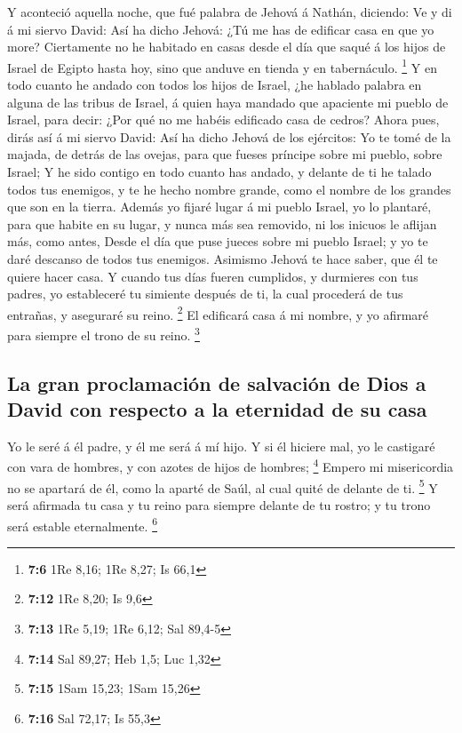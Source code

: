  Y aconteció aquella noche, que fué palabra de Jehová á
Nathán, diciendo:  Ve y di á mi siervo David: Así ha dicho
Jehová: ¿Tú me has de edificar casa en que yo more? 
Ciertamente no he habitado en casas desde el día que saqué á los hijos
de Israel de Egipto hasta hoy, sino que anduve en tienda y en
tabernáculo. \footnote{\textbf{7:6} 1Re 8,16; 1Re 8,27; Is 66,1}
 Y en todo cuanto he andado con todos los hijos de Israel,
¿he hablado palabra en alguna de las tribus de Israel, á quien haya
mandado que apaciente mi pueblo de Israel, para decir: ¿Por qué no me
habéis edificado casa de cedros?  Ahora pues, dirás así á
mi siervo David: Así ha dicho Jehová de los ejércitos: Yo te tomé de la
majada, de detrás de las ovejas, para que fueses príncipe sobre mi
pueblo, sobre Israel;  Y he sido contigo en todo cuanto
has andado, y delante de ti he talado todos tus enemigos, y te he hecho
nombre grande, como el nombre de los grandes que son en la tierra.
 Además yo fijaré lugar á mi pueblo Israel, yo lo
plantaré, para que habite en su lugar, y nunca más sea removido, ni los
inicuos le aflijan más, como antes,  Desde el día que
puse jueces sobre mi pueblo Israel; y yo te daré descanso de todos tus
enemigos. Asimismo Jehová te hace saber, que él te quiere hacer casa.
 Y cuando tus días fueren cumplidos, y durmieres con tus
padres, yo estableceré tu simiente después de ti, la cual procederá de
tus entrañas, y aseguraré su reino. \footnote{\textbf{7:12} 1Re 8,20; Is
  9,6}  El edificará casa á mi nombre, y yo afirmaré para
siempre el trono de su reino. \footnote{\textbf{7:13} 1Re 5,19; 1Re
  6,12; Sal 89,4-5}

\hypertarget{la-gran-proclamaciuxf3n-de-salvaciuxf3n-de-dios-a-david-con-respecto-a-la-eternidad-de-su-casa}{%
\subsection{La gran proclamación de salvación de Dios a David con
respecto a la eternidad de su
casa}\label{la-gran-proclamaciuxf3n-de-salvaciuxf3n-de-dios-a-david-con-respecto-a-la-eternidad-de-su-casa}}

 Yo le seré á él padre, y él me será á mí hijo. Y si él
hiciere mal, yo le castigaré con vara de hombres, y con azotes de hijos
de hombres; \footnote{\textbf{7:14} Sal 89,27; Heb 1,5; Luc 1,32}
 Empero mi misericordia no se apartará de él, como la
aparté de Saúl, al cual quité de delante de ti. \footnote{\textbf{7:15}
  1Sam 15,23; 1Sam 15,26}  Y será afirmada tu casa y tu
reino para siempre delante de tu rostro; y tu trono será estable
eternalmente. \footnote{\textbf{7:16} Sal 72,17; Is 55,3}

